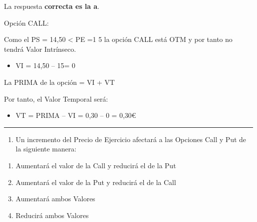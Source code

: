 \documentclass[
  letterpaper,
  DIV=11,
  numbers=noendperiod]{scrreprt}
\providecommand{\tightlist}{%
  \setlength{\itemsep}{0pt}\setlength{\parskip}{0pt}}\usepackage{longtable,booktabs,array}
\begin{document}
\begin{tcolorbox}[enhanced jigsaw, left=2mm, opacityback=0, colback=white, breakable, arc=.35mm, bottomrule=.15mm, rightrule=.15mm, toprule=.15mm, leftrule=.75mm, colframe=quarto-callout-tip-color-frame]
\begin{minipage}[t]{5.5mm}
\textcolor{quarto-callout-tip-color}{\faLightbulb}
\end{minipage}%
\begin{minipage}[t]{\textwidth - 5.5mm}

La respuesta \textbf{correcta es la a}.

Opción CALL:

Como el PS = 14,50 \textless{} PE =1 5 la opción CALL está OTM y por
tanto no tendrá Valor Intrínseco.

\begin{itemize}
\tightlist
\item
  VI = 14,50 -- 15= 0
\end{itemize}

La PRIMA de la opción = VI + VT

Por tanto, el Valor Temporal será:

\begin{itemize}
\tightlist
\item
  VT = PRIMA -- VI = 0,30 -- 0 = 0,30€
\end{itemize}

\end{minipage}%
\end{tcolorbox}

\begin{center}\rule{0.5\linewidth}{0.5pt}\end{center}

\begin{enumerate}
\def\labelenumi{\arabic{enumi}.}
\setcounter{enumi}{22}
\tightlist
\item
  Un incremento del Precio de Ejercicio afectará a las Opciones Call y
  Put de la siguiente manera:
\end{enumerate}

\begin{enumerate}
\def\labelenumi{\alph{enumi})}
\item
  Aumentará el valor de la Call y reducirá el de la Put
\item
  Aumentará el valor de la Put y reducirá el de la Call
\item
  Aumentará ambos Valores
\item
  Reducirá ambos Valores
\end{enumerate}
\end{document}
